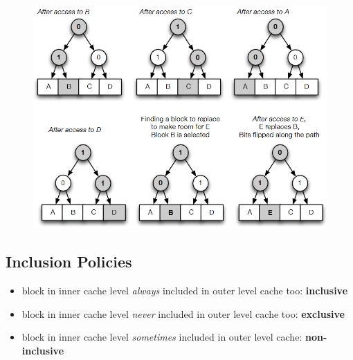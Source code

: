 \documentclass[12pt]{extarticle}
\begin{document}
	\begin{figure}[ht!]
		\centering
		\includegraphics[scale=0.7]{assets/plru-walkthrough.png}
	\end{figure}

	\newpage

	\subsection{Inclusion Policies}

	\begin{itemize}
		\item block in inner cache level \textit{always} included in outer level cache too: \textbf{inclusive}
		\item block in inner cache level \textit{never} included in outer level cache too: \textbf{exclusive}
		\item block in inner cache level \textit{sometimes} included in outer level cache: \textbf{non-inclusive}
	\end{itemize}
\end{document}
